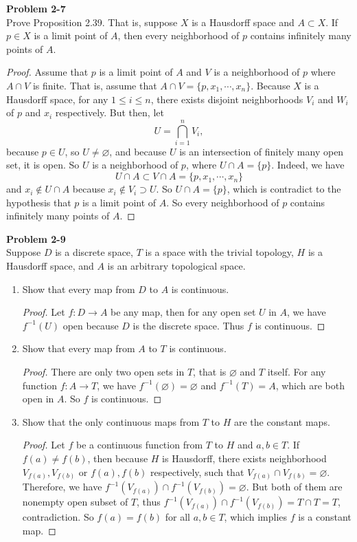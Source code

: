 \documentclass[12pt, a4paper]{article}
\theoremstyle{plain}
\newenvironment{problem}[2][Problem]
    { \begin{mdframed}[backgroundcolor=gray!20] \textbf{#1 #2} \\}
    {  \end{mdframed}}
\begin{document}
\begin{problem}{2-7}
Prove Proposition 2.39. That is, suppose $X$ is a Hausdorff space and $A\subset X$. If $p\in X$ is a limit point of $A$, then every neighborhood of $p$ contains infinitely many points of $A$.
\end{problem}
	\begin{proof}
	Assume that $p$ is a limit point of $A$ and $V$ is a neighborhood of $p$ where $A\cap V$ is finite. That is, assume that $A\cap V=\{p,x_1,\cdots,x_n\}$. Because $X$ is a Hausdorff space, for any $1\leq i\leq n$, there exists disjoint neighborhoods $V_i$ and $W_i$ of $p$ and $x_i$ respectively. But then, let 
	\[
	U=\bigcap_{i=1}^n{V_i},
	\]
	because $p\in U$, so $U\neq \varnothing$, and because $U$ is an intersection of finitely many open set, it is open. So $U$ is a neighborhood of $p$, where $U\cap A=\{p\}$. Indeed, we have
	\[
	U\cap A\subset V\cap A=\{p,x_1,\cdots,x_n\}
	\]
	and $x_i\notin U\cap A$ because $x_i\notin V_i\supset U$. So $U\cap A=\{p\}$, which is contradict to the hypothesis that $p$ is a limit point of $A$. So every neighborhood of $p$ contains infinitely many points of $A$.
	\end{proof}

\begin{problem}{2-9}
Suppose $D$ is a discrete space, $T$ is a space with the trivial topology, $H$ is a Hausdorff space, and $A$ is an arbitrary topological space.
\begin{enumerate}[label=(\alph*)]
\item Show that every map from $D$ to $A$ is continuous.
	\begin{proof}
	Let $f:D\rightarrow A$ be any map, then for any open set $U$ in $A$, we have $f^{-1}(U)$ open because $D$ is the discrete space. Thus $f$ is continuous.
	\end{proof}

\item Show that every map from $A$ to $T$ is continuous.
	\begin{proof}
	There are only two open sets in $T$, that is $\varnothing$ and $T$ itself. For any function $f:A\rightarrow T$, we have $f^{-1}(\varnothing)=\varnothing$ and $f^{-1}(T)=A$, which are both open in $A$. So $f$ is continuous.
	\end{proof}

\item Show that the only continuous maps from $T$ to $H$ are the constant maps.
	\begin{proof}
	Let $f$ be a continuous function from $T$ to $H$ and $a,b\in T$. If $f(a)\neq f(b)$, then because $H$ is Hausdorff, there exists neighborhood $V_{f(a)},V_{f(b)}$ or $f(a),f(b)$ respectively, such that $V_{f(a)}\cap V_{f(b)}=\varnothing$. Therefore, we have $f^{-1}(V_{f(a)})\cap f^{-1}(V_{f(b)})=\varnothing$. But both of them are nonempty open subset of $T$, thus $f^{-1}(V_{f(a)})\cap f^{-1}(V_{f(b)})=T\cap T=T$, contradiction. So $f(a)=f(b)$ for all $a,b\in T$, which implies $f$ is a constant map.
	\end{proof}
\end{enumerate}
\end{problem}
\end{document}
